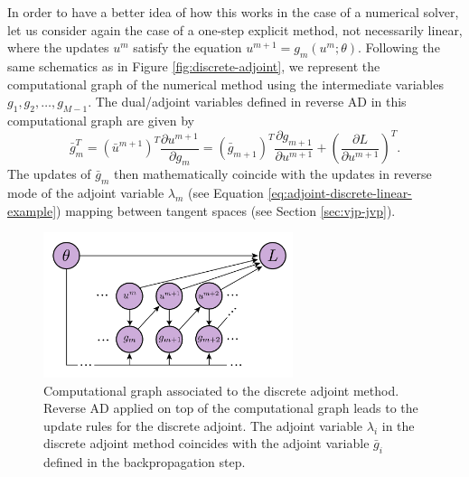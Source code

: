 In order to have a better idea of how this works in the case of a numerical solver, let us consider again the case of a one-step explicit method, not necessarily linear, where the updates $u^m$ satisfy the equation $u^{m+1} = g_{m}(u^{m}; \theta)$.
Following the same schematics as in Figure \ref{fig:discrete-adjoint}, we represent the computational graph of the numerical method using the intermediate variables $g_1, g_2, \ldots, g_{M-1}$.
The dual/adjoint variables defined in reverse AD in this computational graph are given by 
\begin{equation}
    \bar g_m^T
    = 
    (\bar u^{m+1})^T \frac{\partial u^{m+1}}{\partial g_m} 
    = 
    (\bar g_{m+1})^T \frac{\partial g_{m+1}}{\partial u^{m+1}}
    + 
    \left(\frac{\partial L}{\partial u^{m+1}}\right)^T.
\end{equation}
The updates of $\bar g_m$ then mathematically coincide with the updates in reverse mode of the adjoint variable $\lambda_m$ (see Equation \eqref{eq:adjoint-discrete-linear-example}) mapping between tangent spaces (see Section \ref{sec:vjp-jvp}).

\begin{figure}[t]
    \centering
    \includegraphics[width=0.65\textwidth]{figures/AD-discrete-adjoint.pdf}
    \caption{Computational graph associated to the discrete adjoint method. Reverse AD applied on top of the computational graph leads to the update rules for the discrete adjoint. The adjoint variable $\lambda_i$ in the discrete adjoint method coincides with the adjoint variable $\bar g_i$ defined in the backpropagation step.}
    \label{fig:ad-vs-discrete-adjoint}
\end{figure}

